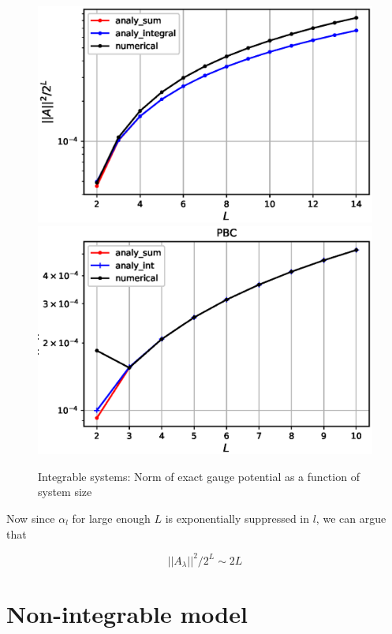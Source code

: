 \documentclass[11pt,a4paper]{article}
\begin{document}
\begin{figure}[!ht]
\begin{center}
\includegraphics[scale=0.7]{new_pics/OBC_int_comparing_num_anal_norm_L_scaling.eps}
\includegraphics[scale=0.7]{new_pics/PBC_int_comparing_num_anal_norm_L_scaling.eps}
\caption{Integrable systems: Norm of exact gauge potential as a function of system size }
\end{center}
\end{figure}



Now since $\alpha_l$ for large enough $L$ is exponentially suppressed in $l$, we can argue that


\begin{equation}
\boxed{||A_{\lambda}||^2 / 2^L \sim 2 L }
\end{equation}

\section{Non-integrable model}
\end{document}
